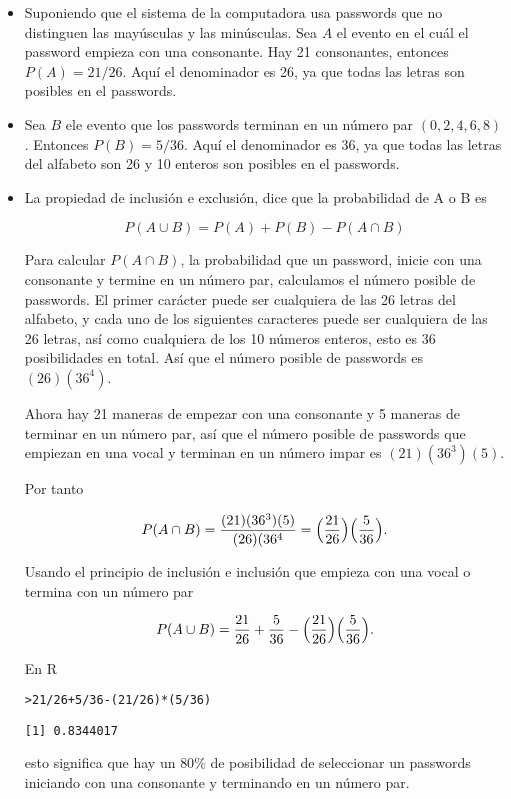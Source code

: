 \documentclass{article}\usepackage[]{graphicx}\usepackage[]{color}
\makeatletter
\newcommand{\hlnum}[1]{\textcolor[rgb]{0.686,0.059,0.569}{#1}}%
\newcommand{\hlopt}[1]{\textcolor[rgb]{0,0,0}{#1}}%
\newcommand{\hlstd}[1]{\textcolor[rgb]{0.345,0.345,0.345}{#1}}%
\newenvironment{kframe}{%
 \def\at@end@of@kframe{}%
 \ifinner\ifhmode%
  \def\at@end@of@kframe{\end{minipage}}%
  \begin{minipage}{\columnwidth}%
 \fi\fi%
 \def\FrameCommand##1{\hskip\@totalleftmargin \hskip-\fboxsep
 \colorbox{shadecolor}{##1}\hskip-\fboxsep
     \hskip-\linewidth \hskip-\@totalleftmargin \hskip\columnwidth}%
 \MakeFramed {\advance\hsize-\width
   \@totalleftmargin\z@ \linewidth\hsize
   \@setminipage}}%
 {\par\unskip\endMakeFramed%
 \at@end@of@kframe}
\newenvironment{knitrout}{}{} %
\makeatother
\begin{document}
\begin{itemize}
\item Suponiendo que el sistema de la  computadora usa passwords que no distinguen  las may\'usculas y las min\'usculas. Sea $A$ el evento en el cu\'al el password empieza con una consonante. Hay 21 consonantes, entonces $P(A) = 21/26$. Aqu\'i el denominador es 26, ya que todas las letras  son posibles en el passwords.
\item Sea $B$ ele evento que los passwords terminan en un n\'umero par $(0, 2,4 ,6, 8)$. Entonces $P(B) =5 /36$. Aqu\'i el denominador es 36, ya que todas las letras del alfabeto son 26 y 10 enteros son posibles en el passwords.
\item La  propiedad de inclusi\'on e exclusi\'on, dice que la probabilidad de A o B es

\[
P(A\cup B) = P(A) + P(B) -P(A \cap B)
\]

Para calcular $P(A \cap B)$, la probabilidad que un password, inicie con una consonante y termine en un n\'umero par, calculamos el n\'umero posible de passwords. El primer car\'acter puede ser cualquiera de las 26 letras del alfabeto, y cada uno de los siguientes caracteres puede ser cualquiera de las 26 letras, as\'i como cualquiera de los 10 n\'umeros enteros, esto es 36 posibilidades en total. As\'i que el n\'umero posible de passwords es $(26)(36^{4})$.

\vspace{0.2cm}

Ahora hay 21 maneras de empezar con una consonante y 5 maneras de terminar en un n\'umero par, as\'i que el n\'umero posible de passwords que empiezan en una vocal y terminan en un n\'umero impar es $(21)(36^3)(5)$.

Por tanto

\[
P(A \cap B) = \frac{(21)(36^3)(5)}{(26)(36^{4}} = \Bigl( \frac{21}{26}\Bigr)\Bigl( \frac{5}{36}\Bigr).
\]

Usando el principio de inclusi\'on e inclusi\'on que empieza con una vocal o termina con un n\'umero par

\[
P(A \cup B) = \frac{21}{26} + \frac{5}{36} -  \Bigl( \frac{21}{26}\Bigr)\Bigl( \frac{5}{36}\Bigr).
\]

En R


\begin{knitrout}
\color{fgcolor}\begin{kframe}
\begin{alltt}
\hlstd{> }\hlnum{21}\hlopt{/}\hlnum{26} \hlopt{+} \hlnum{5}\hlopt{/}\hlnum{36} \hlopt{-} \hlstd{(}\hlnum{21}\hlopt{/}\hlnum{26}\hlstd{)}\hlopt{*}\hlstd{(}\hlnum{5}\hlopt{/}\hlnum{36}\hlstd{)}
\end{alltt}
\begin{verbatim}
[1] 0.8344017
\end{verbatim}
\end{kframe}
\end{knitrout}

esto significa que hay un $80\%$ de posibilidad de seleccionar un passwords iniciando con una consonante y terminando  en un n\'umero par.


\end{itemize}
\vspace {0.5cm}
\end{document}
